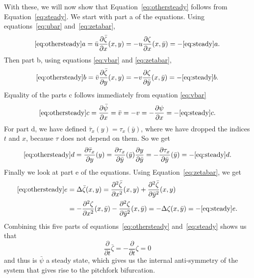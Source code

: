 With these, we will now show that Equation~\eqref{eq:othersteady} follows from Equation~\eqref{eq:steady}.
We start with part a of the equations. Using equations~\eqref{eq:ubar} and~\eqref{eq:zetabar},
\begin{equation}
\ref{eq:othersteady} a=\bar u\frac{\partial\bar{\zeta}}{\partial x} (x,y) =-u \frac{\partial\zeta}{\partial x} (x,\bar y)=-\ref{eq:steady}a.
\end{equation}
Then part b, using equations \eqref{eq:vbar} and \eqref{eq:zetabar},
\begin{equation}
\ref{eq:othersteady}b=\bar{v}\frac{\partial\bar{\zeta}}{\partial y} (x,y) =-v \frac{\partial\zeta}{\partial \bar y} (x,\bar y)=-\ref{eq:steady}b.
\end{equation}
Equality of the parts c follows immediately from equation \ref{eq:vbar}
$$\ref{eq:othersteady}c=\frac{\partial \bar{\psi}}{\partial x}=\bar{v}=-v=-\frac{\partial \psi}{\partial x}=-\ref{eq:steady}c.$$
For part d, we have defined $\bar{\tau}_x(y)=\tau_x(\bar y)$, where we have dropped the indices $t$ and $x$, because $\tau$ does not depend on them. So we get
$$\ref{eq:othersteady}d=\frac{\partial \bar \tau_x}{\partial y}(y)=\frac{\partial \tau_x}{\partial \bar y}(\bar y)\frac{\partial y}{\partial \bar y}=-\frac{\partial \tau_x}{\partial \bar y}(\bar y)=-\ref{eq:steady}d.$$
Finally we look at part e of the equations. Using Equation~\eqref{eq:zetabar}, we get
\begin{align}
\ref{eq:othersteady}e& =\Delta \bar{\zeta}(x,y)
=\frac{\partial^2\bar{\zeta}}{\partial x^2}(x, y)+\frac{\partial^2\bar{\zeta}}{\partial \bar y^2}(x, y) \\
&=-\frac{\partial^2\zeta}{\partial x^2}(x,\bar y)-\frac{\partial^2\zeta}{\partial \bar y^2}(x,\bar y)=-\Delta\zeta(x,\bar y)=-\ref{eq:steady} e.
\end{align}
Combining this five parts of equations~\eqref{eq:othersteady} and~\eqref{eq:steady} shows us that
$$\frac{\partial}{\partial t}\bar{\zeta}=-\frac{\partial}{\partial t}\zeta=0$$ and thus is $\bar{\psi}$ a steady state, which gives us the internal anti-symmetry of the system that gives rise to the pitchfork bifurcation.



